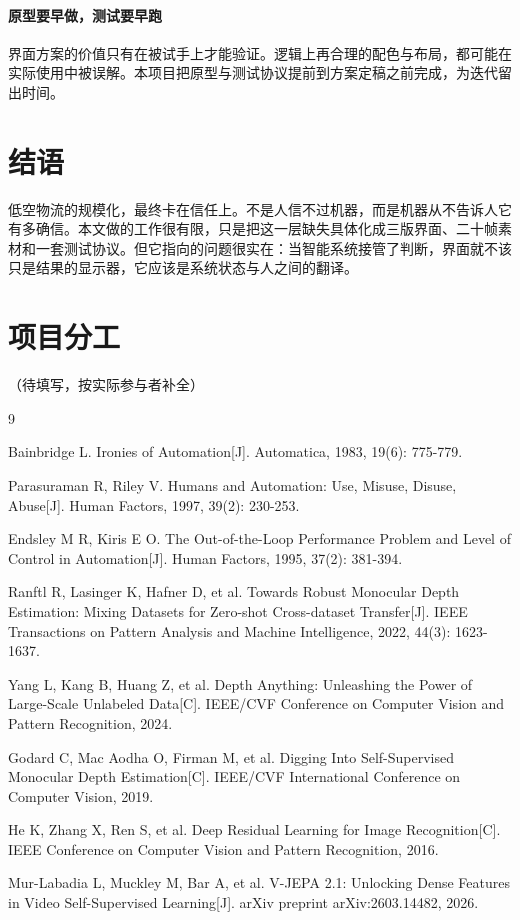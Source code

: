 \documentclass[12pt,a4paper]{ctexart}
\begin{document}
\paragraph{原型要早做，测试要早跑}
界面方案的价值只有在被试手上才能验证。逻辑上再合理的配色与布局，都可能在实际使用中被误解。本项目把原型与测试协议提前到方案定稿之前完成，为迭代留出时间。

\section{结语}

低空物流的规模化，最终卡在信任上。不是人信不过机器，而是机器从不告诉人它有多确信。本文做的工作很有限，只是把这一层缺失具体化成三版界面、二十帧素材和一套测试协议。但它指向的问题很实在：当智能系统接管了判断，界面就不该只是结果的显示器，它应该是系统状态与人之间的翻译。

\section*{项目分工}

（待填写，按实际参与者补全）

\begin{thebibliography}{9}

 Bainbridge L. Ironies of Automation[J]. Automatica, 1983, 19(6): 775-779.

 Parasuraman R, Riley V. Humans and Automation: Use, Misuse, Disuse, Abuse[J]. Human Factors, 1997, 39(2): 230-253.

 Endsley M R, Kiris E O. The Out-of-the-Loop Performance Problem and Level of Control in Automation[J]. Human Factors, 1995, 37(2): 381-394.

 Ranftl R, Lasinger K, Hafner D, et al. Towards Robust Monocular Depth Estimation: Mixing Datasets for Zero-shot Cross-dataset Transfer[J]. IEEE Transactions on Pattern Analysis and Machine Intelligence, 2022, 44(3): 1623-1637.

 Yang L, Kang B, Huang Z, et al. Depth Anything: Unleashing the Power of Large-Scale Unlabeled Data[C]. IEEE/CVF Conference on Computer Vision and Pattern Recognition, 2024.

 Godard C, Mac Aodha O, Firman M, et al. Digging Into Self-Supervised Monocular Depth Estimation[C]. IEEE/CVF International Conference on Computer Vision, 2019.

 He K, Zhang X, Ren S, et al. Deep Residual Learning for Image Recognition[C]. IEEE Conference on Computer Vision and Pattern Recognition, 2016.

 Mur-Labadia L, Muckley M, Bar A, et al. V-JEPA 2.1: Unlocking Dense Features in Video Self-Supervised Learning[J]. arXiv preprint arXiv:2603.14482, 2026.

\end{thebibliography}
\end{document}

